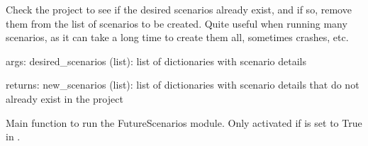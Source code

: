 \documentclass[letterpaper,10pt,english]{sphinxmanual}
\begin{document}

\begin{fulllineitems}
\label{\detokenize{WasteAndMaterialFootprint:WasteAndMaterialFootprint.FutureScenarios.check_existing}}
\pysigstartsignatures
{}
\pysigstopsignatures
\sphinxAtStartPar
Check the project to see if the desired scenarios already exist, and if so, remove them from the list of scenarios to be created.
Quite useful when running many scenarios, as it can take a long time to create them all, sometimes crashes, etc.

\sphinxAtStartPar
args: desired\_scenarios (list): list of dictionaries with scenario details

\sphinxAtStartPar
returns: new\_scenarios (list): list of dictionaries with scenario details that do not already exist in the project

\end{fulllineitems}


\begin{fulllineitems}
\label{\detokenize{WasteAndMaterialFootprint:WasteAndMaterialFootprint.FutureScenarios.main}}
\pysigstartsignatures
{}
\pysigstopsignatures
\sphinxAtStartPar
Main function to run the FutureScenarios module.
Only activated if  is set to True in .

\end{fulllineitems}

\end{document}
